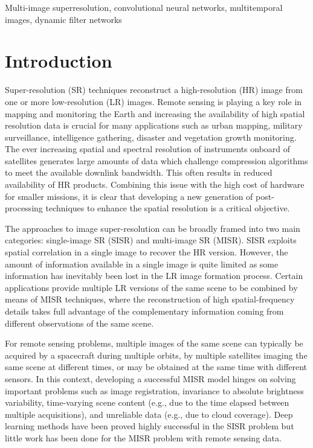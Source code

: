 \documentclass[journal]{IEEEtran}
\begin{document}
\begin{IEEEkeywords}
Multi-image superresolution, convolutional neural networks, multitemporal images, dynamic filter networks
\end{IEEEkeywords}






\IEEEpeerreviewmaketitle



\section{Introduction}

Super-resolution (SR) techniques reconstruct a high-resolution (HR) image from one or more low-resolution (LR) images. Remote sensing is playing a key role in mapping and monitoring the Earth and increasing the availability of high spatial resolution data is crucial for many applications such as urban mapping, military surveillance, intelligence gathering, disaster and vegetation growth monitoring. The ever increasing spatial and spectral resolution of instruments onboard of satellites generates large amounts of data which challenge compression algorithms \cite{Valsesia2014TGARS,Valsesia2016Universal} to meet the available downlink bandwidth. This often results in reduced availability of HR products. Combining this issue with the high cost of hardware for smaller missions, it is clear that developing a new generation of post-processing techniques to enhance the spatial resolution is a critical objective.
 
The approaches to image super-resolution can be broadly framed into two main categories: single-image SR (SISR) and multi-image SR (MISR). SISR exploits spatial correlation in a single image to recover the HR version. However, the amount of information available in a single image is quite limited as some information has inevitably been lost in the LR image formation process. Certain applications provide multiple LR versions of the same scene to be combined by means of MISR techniques, where the reconstruction of high spatial-frequency details takes full advantage of the complementary information coming from different observations of the same scene. 


For remote sensing problems, multiple images of the same scene can typically be acquired by a spacecraft during multiple orbits, by multiple satellites imaging the same scene at different times, or may be obtained at the same time with different sensors. In this context, developing a successful MISR model hinges on solving important problems such as image registration, invariance to absolute brightness variability, time-varying scene content (e.g., due to the time elapsed between multiple acquisitions), and unreliable data (e.g., due to cloud coverage). Deep learning methods have been proved highly successful in the SISR problem but little work has been done for the MISR problem with remote sensing data.
\end{document}
